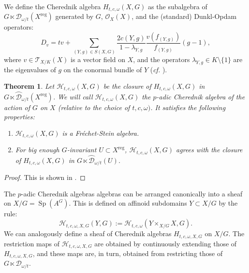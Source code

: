 \documentclass{amsart}
\newtheorem{teo}[defi]{ Theorem}
\newcommand{\Sp}{\operatorname{Sp}}
\newcommand{\D}{\mathcal{D}}
\newcommand{\OX}{\mathcal{O}}
\begin{document}
We define the Cherednik algebra $H_{t,c,\omega}(X,G)$ as the subalgebra of $G\ltimes \D_{\omega/t}(X^{\operatorname{reg}})$ generated by $G$, $\OX_X(X)$, and the (standard) Dunkl-Opdam operators: 
\begin{equation*}
    D_{v}=tv+\sum_{(Y,g)\in S(X,G)}\frac{2c(Y,g)}{1-\lambda_{Y,g}}\frac{v(f_{(Y,g)})}{f_{(Y,g)}}(g-1),
\end{equation*}
where $v\in \mathcal{T}_{X/K}(X)$  is a vector field on $X$, and the operators $\lambda_{Y,g}\in K\setminus \{1\}$ are the eigenvalues of $g$ on the conormal bundle of $Y$  (\emph{cf.}  \cite[Proposition 2.1.14]{p-adicCheralg}).
\begin{teo}\label{teo defi Cher alg}
Let $\mathcal{H}_{t,c,\omega}(X,G)$
be the closure of  $H_{t,c,\omega}(X,G)$ in $G\ltimes \wideparen{\D}_{\omega/t}(X^{\operatorname{reg}})$. We will call $\mathcal{H}_{t,c,\omega}(X,G)$
the $p$-adic Cherednik algebra of the action of  $G$ on $X$ (relative to the choice of $t,c,\omega)$. It satisfies the following properties:
\begin{enumerate}[label=(\roman*)]
    \item $\mathcal{H}_{t,c,\omega}(X,G)$ is a Fréchet-Stein algebra.
    \item For big enough $G$-invariant  $U\subset X^{\operatorname{reg}}$, $\mathcal{H}_{t,c,\omega}(X,G)$ agrees with the closure of $H_{t,c,\omega}(X,G)$ in $G\ltimes \wideparen{\D}_{\omega/t}(U)$.
\end{enumerate}
\end{teo}
\begin{proof}
This is shown in \cite[Theorem A]{p-adicCheralg}.
\end{proof}
The $p$-adic Cherednik algebras algebras can be arranged canonically into a sheaf on $X/G=\Sp(A^G)$. This is defined on  affinoid subdomains  $Y \subset X/G$ by the rule:
\begin{equation*}
    \mathcal{H}_{t,c,\omega,X,G}(Y,G):= \mathcal{H}_{t,c,\omega}(Y\times_{X/G}X,G).    
\end{equation*}
We can analogously define a sheaf of Cherednik algebras $H_{t,c,\omega,X,G}$ on $X/G$. The restriction maps of $\mathcal{H}_{t,c,\omega,X,G}$ are obtained by continuously extending those of $H_{t,c,\omega,X,G}$, and these maps are, in turn, obtained from restricting those of $G\ltimes \D_{\omega/t}$.
\end{document}
